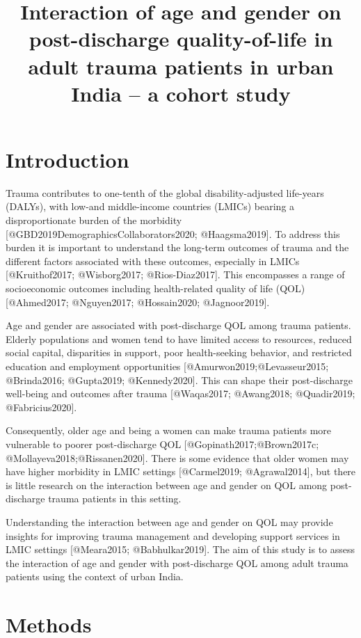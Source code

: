 \documentclass[
]{article}
\title{Interaction of age and gender on post-discharge quality-of-life
in adult trauma patients in urban India -- a cohort study}
\author{}
\date{\vspace{-2.5em}}
\begin{document}
\maketitle

\hypertarget{introduction}{%
\section{Introduction}\label{introduction}}

Trauma contributes to one-tenth of the global disability-adjusted
life-years (DALYs), with low-and middle-income countries (LMICs) bearing
a disproportionate burden of the morbidity
{[}@GBD2019DemographicsCollaborators2020; @Haagsma2019{]}. To address
this burden it is important to understand the long-term outcomes of
trauma and the different factors associated with these outcomes,
especially in LMICs {[}@Kruithof2017; @Wisborg2017; @Rios-Diaz2017{]}.
This encompasses a range of socioeconomic outcomes including
health-related quality of life (QOL) {[}@Ahmed2017; @Nguyen2017;
@Hossain2020; @Jagnoor2019{]}.

Age and gender are associated with post-discharge QOL among trauma
patients. Elderly populations and women tend to have limited access to
resources, reduced social capital, disparities in support, poor
health-seeking behavior, and restricted education and employment
opportunities {[}@Amurwon2019;@Levasseur2015; @Brinda2016; @Gupta2019;
@Kennedy2020{]}. This can shape their post-discharge well-being and
outcomes after trauma {[}@Waqas2017; @Awang2018; @Quadir2019;
@Fabricius2020{]}.

Consequently, older age and being a women can make trauma patients more
vulnerable to poorer post-discharge QOL {[}@Gopinath2017;@Brown2017c;
@Mollayeva2018;@Rissanen2020{]}. There is some evidence that older women
may have higher morbidity in LMIC settings {[}@Carmel2019;
@Agrawal2014{]}, but there is little research on the interaction between
age and gender on QOL among post-discharge trauma patients in this
setting.

Understanding the interaction between age and gender on QOL may provide
insights for improving trauma management and developing support services
in LMIC settings {[}@Meara2015; @Babhulkar2019{]}. The aim of this study
is to assess the interaction of age and gender with post-discharge QOL
among adult trauma patients using the context of urban India.

\hypertarget{methods}{%
\section{Methods}\label{methods}}
\end{document}
